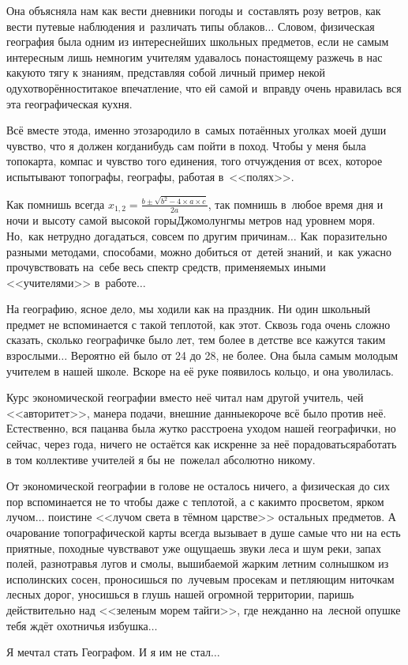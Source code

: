 Она объясняла нам как вести дневники погоды и~составлять розу ветров, как вести путевые наблюдения и~различать типы облаков$\ldots$ Словом, физическая география была одним из интереснейших школьных предметов, если не самым интересным\mdash 
лишь немногим учителям удавалось по\sdash настоящему разжечь в нас какую\sdash то тягу к знаниям, представляя собой личный пример некой одухотворённости\mdash такое впечатление, что ей самой и~вправду очень нравилась вся эта географическая кухня.

Всё вместе это\mdash да, именно это\mdash зародило в~самых потаённых уголках моей души чувство, что я должен когда\sdash нибудь сам пойти в поход. Чтобы у меня была топокарта, компас и чувство того единения, того отчуждения от всех, которое испытывают топографы, географы, работая в~<<полях>>.
 
Как помнишь всегда ${x_{1,2}= \frac{b\pm \sqrt{b^2-4\times a\times c}}{2a}}$, так помнишь в~любое время дня и ночи и высоту самой высокой горы\mdash Джомолунгмы метров над уровнем моря. Но,~как нетрудно догадаться, совсем по другим причинам$\ldots$ Как~поразительно разными методами, способами, можно добиться от~детей знаний, и~как ужасно прочувствовать на~себе весь спектр средств, применяемых иными <<учителями>> в~работе$\ldots$ 

На географию, ясное дело, мы ходили как на праздник. Ни один школьный предмет не вспоминается с такой теплотой, как этот. Сквозь года очень сложно сказать, сколько географичке было лет, тем более в детстве все кажутся таким взрослыми$\ldots$ Вероятно ей было от 24 до 28, не более. Она была самым молодым учителем в нашей школе. Вскоре на её руке появилось кольцо, и она уволилась. 

Курс экономической географии вместо неё читал нам другой учитель, чей <<авторитет>>, манера подачи, внешние данные\mdash короче всё было против неё. Естественно, вся пацанва была жутко расстроена уходом нашей географички, но сейчас, через года, ничего не остаётся как искренне за неё порадоваться\mdash работать в том коллективе учителей я бы не~пожелал абсолютно никому. 

От экономической географии в голове не осталось ничего, а физическая до сих пор вспоминается не то чтобы даже с теплотой, а с каким\sdash то просветом, ярком лучом$\ldots$ поистине <<лучом света в тёмном царстве>> остальных предметов. А очарование топографической карты всегда вызывает в душе самые что ни на есть приятные, походные чувства\mdash вот уже ощущаешь звуки леса и шум реки, запах полей, разнотравья лугов и смолы, вышибаемой жарким летним солнышком из исполинских сосен, проносишься по~лучевым просекам и петляющим ниточкам лесных дорог, уносишься в глушь нашей огромной территории, паришь действительно над <<зеленым морем тайги>>, где нежданно на~лесной опушке тебя ждёт охотничья избушка$\ldots$

Я мечтал стать Географом. И я им не стал$\ldots$

\begin{center}
\end{center}
